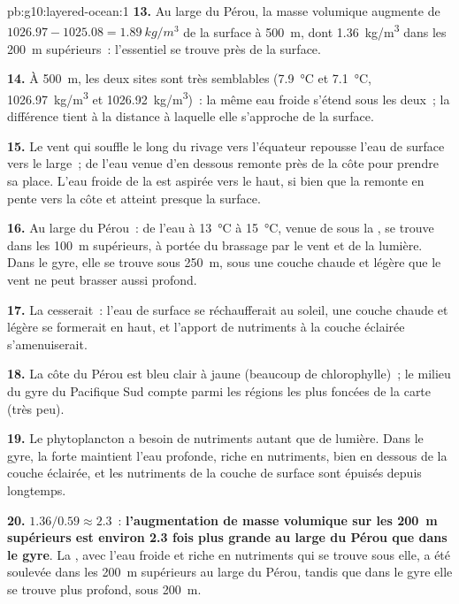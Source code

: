 \begin{solution}{pb:g10:layered-ocean:1}
\textbf{13.} Au large du Pérou, la masse volumique augmente de $1026.97 - 1025.08 =
\qty{1.89}{kg/m^3}$ de la surface à \qty{500}{m}, dont
\qty{1.36}{kg/m^3} dans les \qty{200}{m} supérieurs~: l'essentiel se trouve
près de la surface.

\textbf{14.} À \qty{500}{m}, les deux sites sont très semblables
(\qty{7.9}{\degreeCelsius} et \qty{7.1}{\degreeCelsius},
\qty{1026.97}{kg/m^3} et \qty{1026.92}{kg/m^3})~: la même eau froide
s'étend sous les deux~; la différence tient à la distance à laquelle elle
s'approche de la surface.

\textbf{15.} Le vent qui souffle le long du rivage vers l'équateur repousse
l'eau de surface vers le large~; de l'eau venue d'en dessous remonte près
de la côte pour prendre sa place. L'eau froide de la  est
aspirée vers le haut, si bien que la  remonte en pente vers la
côte et atteint presque la surface.

\textbf{16.} Au large du Pérou~: de l'eau à \qty{13}{\degreeCelsius} à
\qty{15}{\degreeCelsius}, venue de sous la , se trouve dans les
\qty{100}{m} supérieurs, à portée du brassage par le vent et de la lumière.
Dans le gyre, elle se trouve sous \qty{250}{m}, sous une couche chaude et
légère que le vent ne peut brasser aussi profond.

\textbf{17.} La  cesserait~: l'eau de surface se réchaufferait
au soleil, une couche chaude et légère se formerait en haut, et l'apport de
nutriments à la couche éclairée s'amenuiserait.

\textbf{18.} La côte du Pérou est bleu clair à jaune (beaucoup de
chlorophylle)~; le milieu du gyre du Pacifique Sud compte parmi les régions
les plus foncées de la carte (très peu).

\textbf{19.} Le phytoplancton a besoin de nutriments autant que de lumière.
Dans le gyre, la forte  maintient l'eau profonde, riche en
nutriments, bien en dessous de la couche éclairée, et les nutriments de la
couche de surface sont épuisés depuis longtemps.

\textbf{20.} $1.36/0.59 \approx 2.3$~: \textbf{l'augmentation de masse
volumique sur les \qty{200}{m} supérieurs est environ 2.3 fois plus grande
au large du Pérou que dans le gyre}. La , avec l'eau froide et
riche en nutriments qui se trouve sous elle, a été soulevée dans les
\qty{200}{m} supérieurs au large du Pérou, tandis que dans le gyre elle se
trouve plus profond, sous \qty{200}{m}.
\end{solution}
